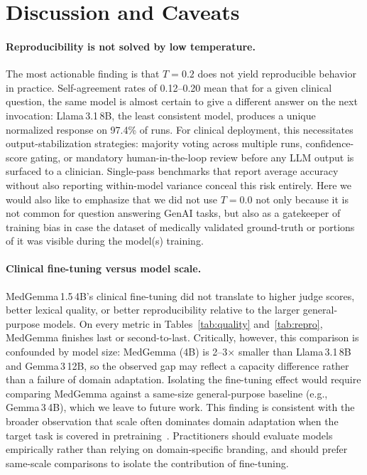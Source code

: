 \documentclass[11pt]{article}
\begin{document}
\section{Discussion and Caveats}
\label{sec:discussion}

\paragraph{Reproducibility is not solved by low temperature.}
The most actionable finding is that $T{=}0.2$ does not yield
reproducible behavior in practice.
Self-agreement rates of 0.12--0.20 mean that for a given clinical
question, the same model is almost certain to give a different answer
on the next invocation: Llama\,3.1\,8B, the least consistent model,
produces a unique normalized response on 97.4\% of runs.
For clinical deployment, this necessitates output-stabilization
strategies: majority voting across multiple runs, confidence-score
gating, or mandatory human-in-the-loop review before any LLM output
is surfaced to a clinician.
Single-pass benchmarks that report average accuracy without also
reporting within-model variance conceal this risk entirely. Here 
we would also like to emphasize that we did not use $T{=}0.0$ not
only because it is not common for question answering GenAI tasks,
but also as a gatekeeper of training bias in case the dataset 
of medically validated ground-truth or portions of it was visible
during the model(s) training. 

\paragraph{Clinical fine-tuning versus model scale.}
MedGemma\,1.5\,4B's clinical fine-tuning did not translate to higher
judge scores, better lexical quality, or better reproducibility
relative to the larger general-purpose models.
On every metric in Tables~\ref{tab:quality} and~\ref{tab:repro},
MedGemma finishes last or second-to-last.
Critically, however, this comparison is confounded by model size:
MedGemma (4B) is 2--3$\times$ smaller than Llama\,3.1\,8B and
Gemma\,3\,12B, so the observed gap may reflect a capacity difference
rather than a failure of domain adaptation.
Isolating the fine-tuning effect would require comparing MedGemma
against a same-size general-purpose baseline (e.g., Gemma\,3\,4B),
which we leave to future work.
This finding is consistent with the broader observation that
scale often dominates domain adaptation when the target task is
covered in pretraining~\cite{singhal2023large, nori2023gpt4med}.
Practitioners should evaluate models empirically rather than relying
on domain-specific branding, and should prefer same-scale comparisons
to isolate the contribution of fine-tuning.
\end{document}
